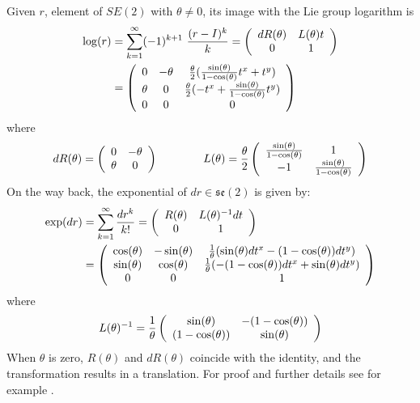 Given $r$, element of $SE(2)$ with $\theta\neq 0$, its image with the Lie group logarithm is
\begin{align*}
\log(r)
&=
\sum_{k=1}^{\infty} (-1)^{k+1}~\frac{(r - I)^k}{k}
=
\left (
\begin{array} {c c }
dR(\theta) & L(\theta)t \\
0 & 1 
\end{array}
\right )
\\
&=
\left (
\begin{array} {c c c}
0   & - \theta& \frac{\theta}{2} (\frac{\sin(\theta)}{1-\cos(\theta)} t^x + t^y )\\
\theta & 0     & \frac{\theta}{2} (- t^x + \frac{\sin(\theta)}{1-\cos(\theta)} t^y )\\
0 & 0 &  0
\end{array}
\right )
\end{align*}
where 
\begin{align*}
dR(\theta) = 
\left (
\begin{array} {c c }
0 & -\theta \\
\theta & 0 
\end{array}
\right )
\qquad \qquad 
L(\theta) = 
\frac{\theta}{2}
\left (
\begin{array} {c c }
\frac{\sin(\theta)}{1-\cos(\theta)} & 1 \\
-1 & \frac{\sin(\theta)}{1-\cos(\theta)}
\end{array}
\right )
\end{align*}
On the way back, the exponential of $dr \in \mathfrak{se}(2)$ is given by:
\begin{align*}
\exp(dr)
&=
\sum_{k=1}^{\infty} \frac{dr^{k}}{k!}
=
\left (
\begin{array} {c c }
R(\theta) & L(\theta)^{-1}dt \\
0 & 1 
\end{array}
\right )
\\
&=
\left (
\begin{array} {c c c}
\cos(\theta)   & - \sin(\theta)& \frac{1}{\theta} (\sin(\theta)dt^x - (1-\cos(\theta)) dt^y )\\
\sin(\theta) & \cos(\theta)     & \frac{1}{\theta} (- (1-\cos(\theta))dt^x + \sin(\theta) dt^y )\\
0 & 0 &  1
\end{array}
\right )
\end{align*}
where
\begin{align*}
L(\theta)^{-1} = 
\frac{1}{\theta}
\left (
\begin{array} {c c }
\sin(\theta) & -(1-\cos(\theta)) \\
(1-\cos(\theta)) & \sin(\theta)
\end{array}
\right )
\end{align*}
When $\theta$ is zero, $R(\theta)$ and $dR(\theta)$ coincide with the identity, and the transformation results in a translation. For proof and further details see for example \cite{gallier2011geometric} \cite{hall2015lie}.

